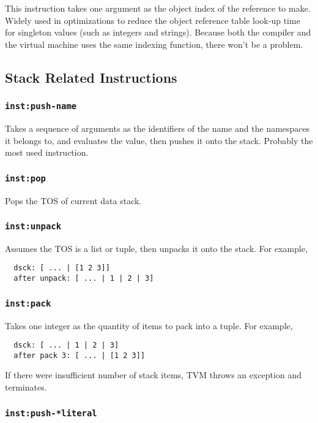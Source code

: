 \documentclass{article}
\newcommand{\inst}[1] {\texttt{inst:#1}}
\begin{document}
This instruction takes one argument as the object index of the reference to make. Widely used in optimizations to reduce the object reference table look-up time for singleton values (such as integers and strings). Because both the compiler and the virtual machine uses the same indexing function, there won't be a problem.

\subsection{Stack Related Instructions}

\subsubsection{\inst{push-name}}

Takes a sequence of arguments as the identifiers of the name and the namespaces it belongs to, and evaluates the value, then pushes it onto the stack. Probably the most used instruction.

\subsubsection{\inst{pop}}

Pops the TOS of current data stack.

\subsubsection{\inst{unpack}}

Assumes the TOS is a list or tuple, then unpacks it onto the stack. For example,
\begin{verbatim}
  dsck: [ ... | [1 2 3]]
  after unpack: [ ... | 1 | 2 | 3]
\end{verbatim}

\subsubsection{\inst{pack}}

Takes one integer as the quantity of items to pack into a tuple. For example,
\begin{verbatim}
  dsck: [ ... | 1 | 2 | 3]
  after pack 3: [ ... | [1 2 3]]
\end{verbatim}

If there were insufficient number of stack items, TVM throws an exception and terminates.

\subsubsection{\inst{push-*literal}}
\end{document}
